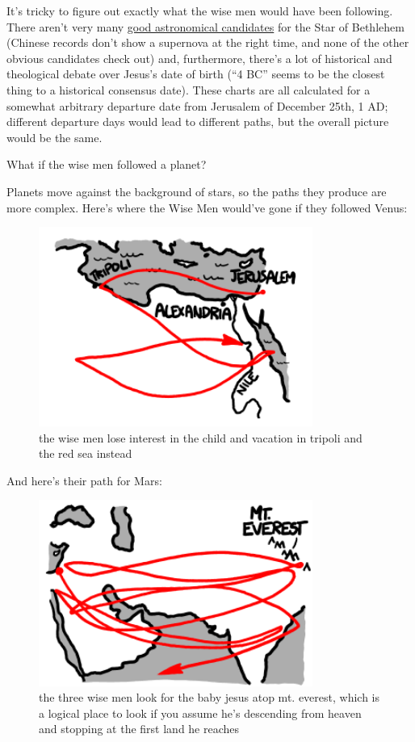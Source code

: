 {It’s tricky to figure out exactly what the wise men would have been following. There aren’t very many \href{http://www.observadores-cometas.com/Star\_of\_Bethlehem/English/Whatnot.htm}{good astronomical candidates} for the Star of Bethlehem (Chinese records don’t show a supernova at the right time, and none of the other obvious candidates check out) and, furthermore, there’s a lot of historical and theological debate over Jesus’s date of birth (“4 BC” seems to be the closest thing to a historical consensus date). These charts are all calculated for a somewhat arbitrary departure date from Jerusalem of December 25th, 1 AD; different departure days would lead to different paths, but the overall picture would be the same.}

{What if the wise men followed a planet?}

{Planets move against the background of stars, so the paths they produce are more complex. Here’s where the Wise Men would’ve gone if they followed Venus:}

\begin{figure}[!htbp]
\centering
\includegraphics[scale=0.5, max width=0.8\textwidth]{imgs/a/25/magi_venus.png}
\caption{the wise men lose interest in the child and vacation in tripoli and the red sea instead}
\end{figure}

{And here’s their path for Mars:}

\begin{figure}[!htbp]
\centering
\includegraphics[scale=0.5, max width=0.8\textwidth]{imgs/a/25/magi_mars.png}
\caption{the three wise men look for the baby jesus atop mt. everest, which is a logical place to look if you assume he's descending from heaven and stopping at the first land he reaches}
\end{figure}


